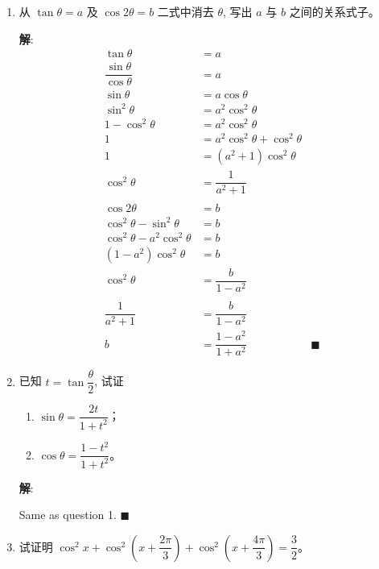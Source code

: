 \documentclass{report}
\newcommand{\sol}{\vspace{0.2cm}\textbf{解}:}
\begin{document}
\begin{enumerate}[leftmargin=*]
        \newpage
        \item 从 $\tan \theta=a$ 及 $\cos 2 \theta=b$ 二式中消去 $\theta$, 写出 $a$ 与 $b$ 之间的关系式子。
        
        \sol{}
        \begin{align*}
            \tan\theta &= a\\
            \dfrac{\sin\theta}{\cos\theta} &= a\\
            \sin\theta &= a\cos\theta\\
            \sin^2\theta &= a^2\cos^2\theta\\
            1-\cos^2\theta &= a^2\cos^2\theta\\
            1 &= a^2\cos^2\theta + \cos^2\theta\\
            1 &= (a^2+1)\cos^2\theta\\
            \cos^2\theta &= \dfrac{1}{a^2+1}\\
            \\
            \cos 2\theta &= b\\
            \cos^2\theta - \sin^2\theta &= b\\
            \cos^2\theta - a^2\cos^2\theta &= b\\
            (1-a^2)\cos^2\theta &= b\\
            \cos^2\theta &= \dfrac{b}{1-a^2}\\
            \\
            \dfrac{1}{a^2+1} &= \dfrac{b}{1-a^2}\\
            b &= \dfrac{1-a^2}{1+a^2} & \blacksquare
        \end{align*}
                
        \item 已知 $t=\tan \dfrac{\theta}{2}$, 试证 
        \begin{enumerate}
            \item $\sin \theta=\dfrac{2 t}{1+t^2}$；
            \item $\cos \theta=\dfrac{1-t^2}{1+t^2}$。
        \end{enumerate}

        \sol{}

        Same as question 1. \hfill $\blacksquare$
                
        \item 试证明 $\cos ^2 x+\cos ^2\left(x+\dfrac{2 \pi}{3}\right)+\cos ^2\left(x+\dfrac{4 \pi}{3}\right)=\dfrac{3}{2}$。
        

\end{enumerate}
\end{document}
